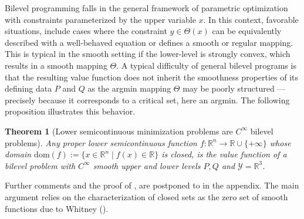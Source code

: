 \documentclass{article}
\newcommand*{\cY}{\mathcal{Y}}
\newcommand*{\RR}{\mathbb{R}}
\newcommand{\dom}{\mathrm{dom}}
\newcommand{\jer}[1]{[[\textcolor{magenta}{#1}]]}
\theoremstyle{plain}
\newtheorem{theorem}{Theorem}[section]
\theoremstyle{definition}
\begin{document}
Bilevel programming falls in the general framework of parametric optimization with constraints parameterized by the upper variable $x$. In this context, favorable situations, include cases where the constraint $y \in \Theta(x)$ can be equivalently described with a well-behaved equation or defines a smooth or regular mapping. This is typical in the smooth setting if the lower-level is strongly convex, which results in a smooth mapping $\Theta$.
A typical difficulty of general bilevel programs is that the resulting value function does not inherit the smoothness properties of its defining data $P$ and $Q$ as the argmin mapping  $\Theta$ may be poorly structured ---precisely because it corresponds to a critical set, here an argmin. The following proposition illustrates this behavior.
\begin{theorem}[Lower semicontinuous minimization problems are $C^\infty$  bilevel problems]
    \label{prop:reduction-lsc}
    Any proper lower semicontinuous function $f:\RR^n \to \RR\cup \{+\infty\}$ whose domain $\dom(f):= \{x \in \RR^n \mid f(x) \in \RR\}$ is closed, is the value function of a bilevel problem with $C^\infty$ smooth upper and lower levels $P,Q$ and $\cY = \RR^{3}$.  
\end{theorem}
{Further comments and the proof of , are postponed to  in the appendix.  The main argument relies on the characterization of closed sets as the zero set of smooth functions due to Whitney (). }%
\end{document}
